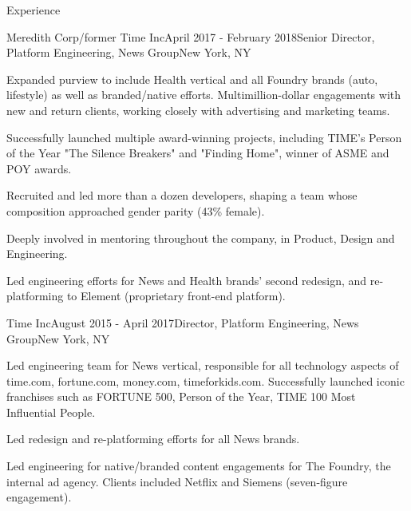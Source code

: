 \documentclass{resume} %
\begin{document}

\begin{rSection}{Experience}

\begin{rSubsection}{Meredith Corp/former Time Inc}{April 2017 - February 2018}{Senior Director, Platform Engineering, News Group}{New York, NY}
\item Expanded purview to include Health vertical and all Foundry brands (auto, lifestyle) as well as branded/native efforts. Multimillion-dollar engagements with new and return clients, working closely with advertising and marketing teams.
\item Successfully launched multiple award-winning projects, including TIME's Person of the Year "The Silence Breakers" and "Finding Home", winner of ASME and POY awards.
\item Recruited and led more than a dozen developers, shaping a team whose composition approached gender parity (43\% female).
\item Deeply involved in mentoring throughout the company, in Product, Design and Engineering. 
\item Led engineering efforts for News and Health brands' second redesign, and re-platforming to Element (proprietary front-end platform).
\end{rSubsection}


\begin{rSubsection}{Time Inc}{August 2015 - April 2017}{Director, Platform Engineering, News Group}{New York, NY}
\item Led engineering team for News vertical, responsible for all technology aspects of time.com, fortune.com, money.com, timeforkids.com. Successfully launched iconic franchises such as FORTUNE 500, Person of the Year, TIME 100 Most Influential People.
\item Led redesign and re-platforming efforts for all News brands.
\item Led engineering for native/branded content engagements for The Foundry, the internal ad agency. Clients included Netflix and Siemens (seven-figure engagement).
\end{rSubsection}



\end{rSection}
\end{document}
